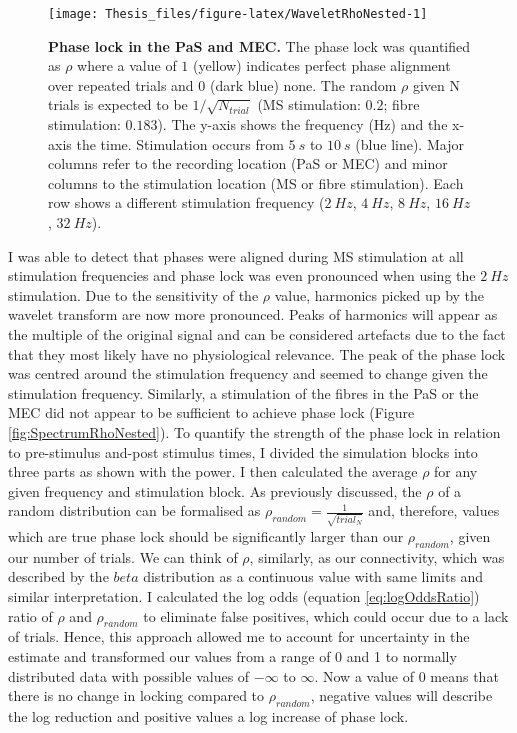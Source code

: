 \documentclass[
  12pt,
  a4paper,
  openany]{book}
\begin{document}
\begin{figure}[htb]

{\centering \texttt{[image: Thesis\_files/figure-latex/WaveletRhoNested-1]} 

}

\caption[Phase lock in the PaS and MEC]{\textbf{Phase lock in the PaS and MEC.} The phase lock was quantified as \(\rho\) where a value of \(1\) (yellow) indicates perfect phase alignment over repeated trials and \(0\) (dark blue) none. The random \(\rho\) given N trials is expected to be \(1/\sqrt{N_{trial}}\) (MS stimulation: \(0.2\); fibre stimulation: \(0.183\)). The y-axis shows the frequency (Hz) and the x-axis the time. Stimulation occurs from \(5\ s\) to \(10\ s\) (blue line). Major columns refer to the recording location (PaS or MEC) and minor columns to the stimulation location (MS or fibre stimulation). Each row shows a different stimulation frequency (\(2\ Hz\), \(4\ Hz\), \(8\ Hz\), \(16\ Hz\), \(32\ Hz\)).}\label{fig:WaveletRhoNested}
\end{figure}

\noindent I was able to detect that phases were aligned during MS stimulation at all stimulation frequencies and phase lock was even pronounced when using the \(2\ Hz\) stimulation. Due to the sensitivity of the \(\rho\) value, harmonics picked up by the wavelet transform are now more pronounced. Peaks of harmonics will appear as the multiple of the original signal and can be considered artefacts due to the fact that they most likely have no physiological relevance. The peak of the phase lock was centred around the stimulation frequency and seemed to change given the stimulation frequency. Similarly, a stimulation of the fibres in the PaS or the MEC did not appear to be sufficient to achieve phase lock (Figure \ref{fig:SpectrumRhoNested}). To quantify the strength of the phase lock in relation to pre-stimulus and-post stimulus times, I divided the simulation blocks into three parts as shown with the power. I then calculated the average \(\rho\) for any given frequency and stimulation block. As previously discussed, the \(\rho\) of a random distribution can be formalised as \(\rho_{random}=\frac{1}{\sqrt{trial_{N}}}\) and, therefore, values which are true phase lock should be significantly larger than our \(\rho_{random}\), given our number of trials. We can think of \(\rho\), similarly, as our connectivity, which was described by the \(beta\) distribution as a continuous value with same limits and similar interpretation. I calculated the log odds (equation \eqref{eq:logOddsRatio}) ratio of \(\rho\) and \(\rho_{random}\) to eliminate false positives, which could occur due to a lack of trials. Hence, this approach allowed me to account for uncertainty in the estimate and transformed our values from a range of 0 and 1 to normally distributed data with possible values of \(-\infty\) to \(\infty\). Now a value of \(0\) means that there is no change in locking compared to \(\rho_{random}\), negative values will describe the log reduction and positive values a log increase of phase lock.
\end{document}
